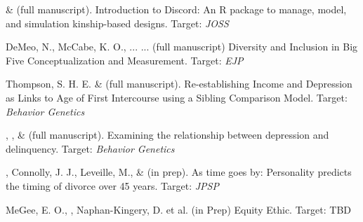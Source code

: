 \item \jt \& \meb (full manuscript). Introduction to Discord: An R package to manage, model, and simulation kinship-based designs. Target: \textit{JOSS}

\item DeMeo, N., McCabe, K. O., ... \meb ... (full manuscript) Diversity and Inclusion in Big Five Conceptualization and Measurement.  Target: \textit{EJP}

\item Thompson, S. H. E. \noteA \& \meb (full manuscript). Re-establishing Income and Depression as Links to Age of First Intercourse using a Sibling Comparison Model. Target: \textit{Behavior Genetics}

\item \emsims, \jt, \& \meb (full manuscript). Examining the relationship between depression and delinquency. Target: \textit{Behavior Genetics}



%
\item \meb, Connolly, J. J., Leveille, M., \& \jjj (in prep). As time goes by: Personality predicts the timing of divorce over 45 years. Target: \textit{JPSP}
%

\item MeGee, E. O., \meb, Naphan-Kingery, D. et al. (in Prep) Equity Ethic. Target: TBD











